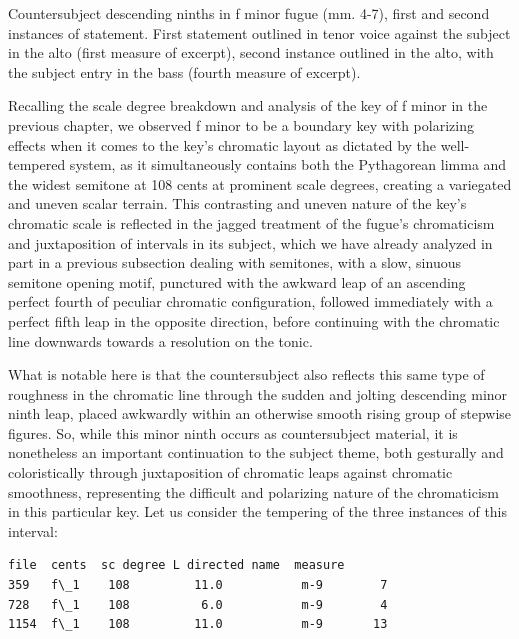 \begin{Example}[H]
    \begin{center}
    \caption[Countersubject descending ninths in f minor fugue (mm. 4-7). ]{ Countersubject descending ninths in f minor fugue (mm. 4-7), first and second instances of statement. First statement outlined in tenor voice against the subject in the alto (first measure of excerpt), second instance outlined in the alto, with the subject entry in the bass (fourth measure of excerpt).}
    \end{center}
\end{Example}
    
    Recalling the scale degree breakdown and analysis of the key of f minor
in the previous chapter, we observed f minor to be a boundary key with
polarizing effects when it comes to the key's chromatic layout as
dictated by the well-tempered system, as it simultaneously contains both
the Pythagorean limma and the widest semitone at 108 cents at prominent
scale degrees, creating a variegated and uneven scalar terrain. This
contrasting and uneven nature of the key's chromatic scale is reflected
in the jagged treatment of the fugue's chromaticism and juxtaposition of
intervals in its subject, which we have already analyzed in part in a
previous subsection dealing with semitones, with a slow, sinuous
semitone opening motif, punctured with the awkward leap of an ascending
perfect fourth of peculiar chromatic configuration, followed immediately
with a perfect fifth leap in the opposite direction, before continuing
with the chromatic line downwards towards a resolution on the tonic.

What is notable here is that the countersubject also reflects this same
type of roughness in the chromatic line through the sudden and jolting
descending minor ninth leap, placed awkwardly within an otherwise smooth
rising group of stepwise figures. So, while this minor ninth occurs as
countersubject material, it is nonetheless an important continuation to
the subject theme, both gesturally and coloristically through
juxtaposition of chromatic leaps against chromatic smoothness,
representing the difficult and polarizing nature of the chromaticism in
this particular key. Let us consider the tempering of the three
instances of this interval:

\begin{Verbatim}[commandchars=\\\{\}]
     file  cents  sc degree L directed name  measure
359   f\_1    108         11.0           m-9        7
728   f\_1    108          6.0           m-9        4
1154  f\_1    108         11.0           m-9       13
\end{Verbatim}


